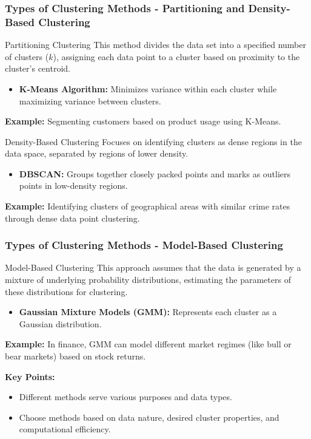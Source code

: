 \documentclass{beamer}
\begin{document}
\begin{frame}[fragile]
    \frametitle{Types of Clustering Methods - Partitioning and Density-Based Clustering}
    \begin{block}{Partitioning Clustering}
        This method divides the data set into a specified number of clusters ($k$), assigning each data point to a cluster based on proximity to the cluster's centroid.
        \begin{itemize}
            \item \textbf{K-Means Algorithm:} Minimizes variance within each cluster while maximizing variance between clusters.
        \end{itemize}
        \textbf{Example:} Segmenting customers based on product usage using K-Means.
    \end{block}
    
    \begin{block}{Density-Based Clustering}
        Focuses on identifying clusters as dense regions in the data space, separated by regions of lower density.
        \begin{itemize}
            \item \textbf{DBSCAN:} Groups together closely packed points and marks as outliers points in low-density regions.
        \end{itemize}
        \textbf{Example:} Identifying clusters of geographical areas with similar crime rates through dense data point clustering.
    \end{block}
\end{frame}

\begin{frame}[fragile]
    \frametitle{Types of Clustering Methods - Model-Based Clustering}
    \begin{block}{Model-Based Clustering}
        This approach assumes that the data is generated by a mixture of underlying probability distributions, estimating the parameters of these distributions for clustering.
        \begin{itemize}
            \item \textbf{Gaussian Mixture Models (GMM):} Represents each cluster as a Gaussian distribution.
        \end{itemize}
        \textbf{Example:} In finance, GMM can model different market regimes (like bull or bear markets) based on stock returns.
    \end{block}
    
    \textbf{Key Points:}
    \begin{itemize}
        \item Different methods serve various purposes and data types.
        \item Choose methods based on data nature, desired cluster properties, and computational efficiency.
    \end{itemize}
\end{frame}
\end{document}
